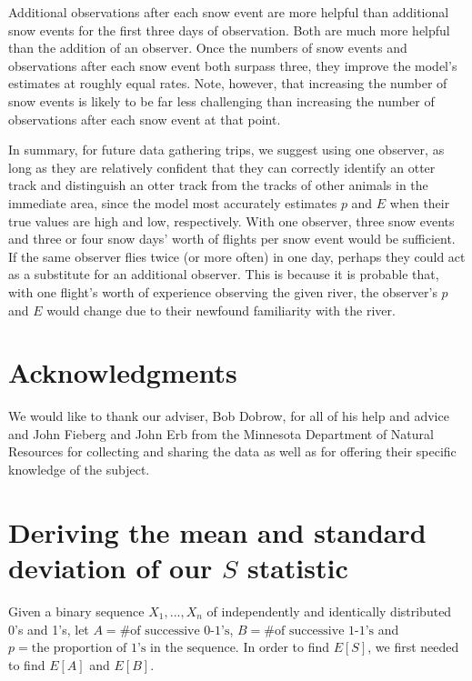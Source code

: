 \documentclass[12pt]{article}
\begin{document}
    Additional observations after each snow event are more helpful than
    additional snow events for the first three days of observation.
    Both are much more helpful than the addition of an observer.
    Once the numbers of snow events and observations after each snow event both
    surpass three, they improve the model's estimates at roughly equal rates.
    Note, however, that increasing the number of snow events is likely to be far
    less challenging than increasing the number of observations after each snow
    event at that point.

    In summary, for future data gathering trips, we suggest using one
    observer, as long as they are relatively confident that they can correctly
    identify an otter track and distinguish an otter track from the tracks of
    other animals in the immediate area, since the model most accurately
    estimates \(p\) and \(E\) when their true values are high and low,
    respectively. With one observer, three snow events and three or four snow
    days' worth of flights per snow event would be sufficient. If the same
    observer flies twice (or more often) in one day, perhaps they could act as a
    substitute for an additional observer. This is because it is probable that,
    with one flight's worth of experience observing the given river, the
    observer's \(p\) and \(E\) would change due to their newfound familiarity
    with the river.

\section{Acknowledgments}
We would like to thank our adviser, Bob Dobrow, for all of his help and advice
and John Fieberg and John Erb from the Minnesota Department of Natural Resources
for collecting and sharing the data as well as for offering their specific
knowledge of the subject.




\appendix
\section{Deriving the mean and standard deviation of our \(S\) statistic}
\label{math}
    Given a binary sequence \(X_1, ..., X_n\) of independently and identically
    distributed 0's and 1's, let \(A=\text{\# of successive 0-1's}\), \(B=
    \text{\# of successive 1-1's}\) and \(p=\text{the proportion of 1's in the
    sequence}\). In order to find \(E[S]\), we first needed to find \(E[A]\) and
    \(E[B]\).
\end{document}
